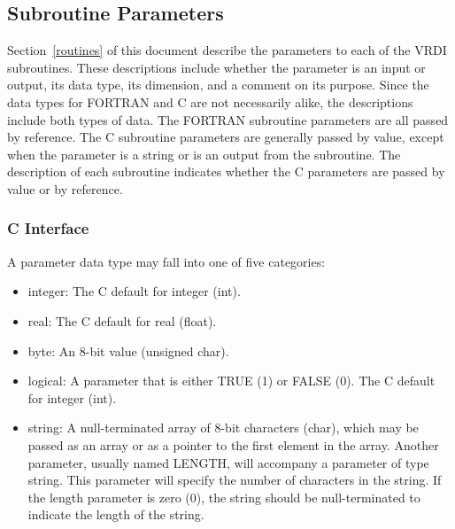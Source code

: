 \subsection{Subroutine Parameters}
Section~\ref{routines} of this document describe the parameters to
each of the VRDI subroutines.  These descriptions include whether the
parameter is an input or output, its data type, its dimension, and a
comment on its purpose.  Since the data types for FORTRAN and C are
not necessarily alike, the descriptions include both types of data.
The FORTRAN subroutine parameters are all passed by reference.  The
C subroutine parameters are generally passed by value, except when
the parameter is a string or is an output from the subroutine.  The
description of each subroutine indicates whether the C parameters
are passed by value or by reference.
\subsubsection{C Interface}
A parameter data type may fall into one of five categories:
\begin{itemize}
\item integer:  The C default for integer (int).
\item real:  The C default for real (float).
\item byte:  An 8-bit value (unsigned char).
\item logical:  A parameter that is either TRUE (1) or FALSE (0).
The C default for integer (int).
\item string:	A null-terminated array of 8-bit characters (char),
which may be passed as an array or as a pointer to the first element
in the array.  Another parameter, usually named LENGTH, will accompany
a parameter of type string.  This parameter will specify the number of
characters in the string.  If the length parameter is zero (0), the
string should be null-terminated to indicate the length of the string.
\end{itemize}
